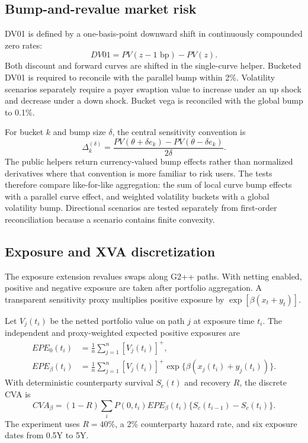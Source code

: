 \documentclass[11pt]{article}
\numberwithin{equation}{section}
\theoremstyle{definition}
\theoremstyle{remark}
\begin{document}
\subsection{Bump-and-revalue market risk}

DV01 is defined by a one-basis-point downward shift in continuously compounded
zero rates:
\begin{equation}
  DV01 = PV(z-1\text{ bp})-PV(z).
\end{equation}
Both discount and forward curves are shifted in the single-curve helper.
Bucketed DV01 is required to reconcile with the parallel bump within 2\%.
Volatility scenarios separately require a payer swaption value to increase
under an up shock and decrease under a down shock. Bucket vega is reconciled
with the global bump to 0.1\%.

For bucket $k$ and bump size $\delta$, the central sensitivity convention is
\begin{equation}
  \Delta_k^{(\delta)}
  =\frac{PV(\theta+\delta e_k)-PV(\theta-\delta e_k)}{2\delta}.
\end{equation}
The public helpers return currency-valued bump effects rather than normalized
derivatives where that convention is more familiar to risk users. The tests
therefore compare like-for-like aggregation: the sum of local curve bump effects
with a parallel curve effect, and weighted volatility buckets with a global
volatility bump. Directional scenarios are tested separately from
first-order reconciliation because a scenario contains finite convexity.

\subsection{Exposure and XVA discretization}

The exposure extension revalues swaps along G2++ paths. With netting enabled,
positive and negative exposure are taken after portfolio aggregation. A
transparent sensitivity proxy multiplies positive exposure by
$\exp[\beta(x_t+y_t)]$.

Let $V_j(t_i)$ be the netted portfolio value on path $j$ at exposure time
$t_i$. The independent and proxy-weighted expected positive exposures are
\begin{align}
  EPE_0(t_i)&=\frac1n\sum_{j=1}^{n}[V_j(t_i)]^+,\\
  EPE_\beta(t_i)&=\frac1n\sum_{j=1}^{n}[V_j(t_i)]^+
  \exp\{\beta(x_j(t_i)+y_j(t_i))\}.
  \label{eq:wwr-epe}
\end{align}
With deterministic counterparty survival $S_c(t)$ and recovery $R$, the
discrete CVA is
\begin{equation}
  CVA_\beta=(1-R)\sum_i P(0,t_i)EPE_\beta(t_i)
  \{S_c(t_{i-1})-S_c(t_i)\}.
\end{equation}
The experiment uses $R=40\%$, a 2\% counterparty hazard rate, and six exposure
dates from 0.5Y to 5Y.
\end{document}
